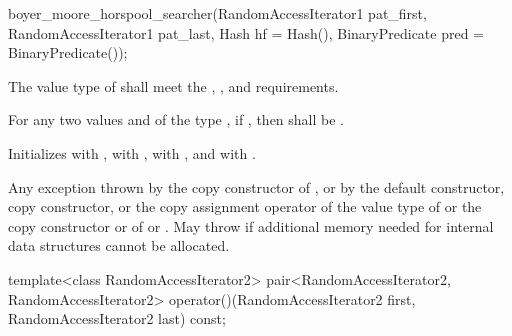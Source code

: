 %
\begin{itemdecl}
boyer_moore_horspool_searcher(RandomAccessIterator1 pat_first,
                              RandomAccessIterator1 pat_last,
                              Hash hf = Hash(),
                              BinaryPredicate pred = BinaryPredicate());
\end{itemdecl}

\begin{itemdescr}
\pnum
\requires
The value type of  shall meet the ,
, and  requirements.

\pnum
\requires
For any two values  and  of the type ,
if , then  shall be .

\pnum
\effects
Initializes
 with ,
 with ,
 with , and
 with .

\pnum
\throws
Any exception thrown by the copy constructor of ,
or by the default constructor, copy constructor, or the copy assignment operator of the value type of 
or the copy constructor or  of  or .
May throw  if additional memory needed for internal data structures cannot be allocated.
\end{itemdescr}

%
\begin{itemdecl}
template<class RandomAccessIterator2>
  pair<RandomAccessIterator2, RandomAccessIterator2>
    operator()(RandomAccessIterator2 first, RandomAccessIterator2 last) const;
\end{itemdecl}

